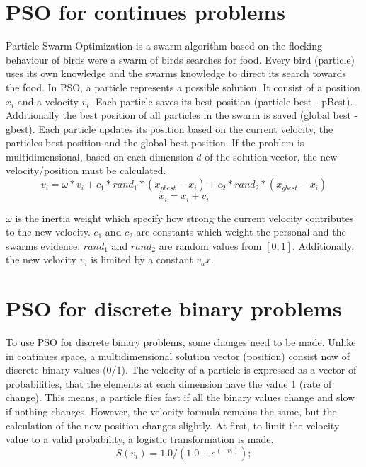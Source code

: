 \documentclass{article}
\begin{document}
\section{PSO for continues problems}
\label{lbl-pso-cont}
Particle Swarm Optimization is a swarm algorithm based on the flocking behaviour of birds were a swarm of birds searches for food. Every bird (particle) uses its own knowledge and the swarms knowledge to direct its search towards the food. In PSO, a particle represents a possible solution. It consist of a position $x_i$ and a velocity $v_i$. Each particle saves its best position (particle best - pBest). Additionally the best position of all particles in the swarm is saved (global best - gbest). Each particle updates its position based on the current velocity, the particles best position and the global best position. If the problem is multidimensional, based on each dimension $d$ of the solution vector, the new velocity/position must be calculated.
\begin{equation}
\label{formula-1}
v_i = \omega * v_i + c_1 * rand_1 * (x_{pbest} - x_i) + c_2 * rand_2 * (x_{gbest} - x_i)
\end{equation}
\begin{equation}
\label{formula-2}
x_i = x_i + v_i
\end{equation}

$\omega$ is the inertia weight which specify how strong the current velocity contributes to the new velocity. $c_1$ and $c_2$ are constants which weight the personal and the swarms evidence. $rand_1$ and $rand_2$ are random values from $[0,1]$. Additionally, the new velocity $v_i$ is limited by a constant $v_ax$.

\section{PSO for discrete binary problems}
\label{lbl-pso-disc}
To use PSO for discrete binary problems, some changes need to be made. Unlike in continues space, a multidimensional solution vector (position) consist now of discrete binary values (0/1). The velocity of a particle is expressed as a vector of probabilities, that the elements at each dimension have the value 1 (rate of change). This means, a particle flies fast if all the binary values change and slow if nothing changes. However, the velocity formula remains the same, but the calculation of the new position changes slightly. At first, to limit the velocity value to a valid probability, a logistic transformation is made.
\begin{equation}
\label{formula-3}
S(v_i) = 1.0 / (1.0 + e^{(-v_i)});
\end{equation}
\end{document}
